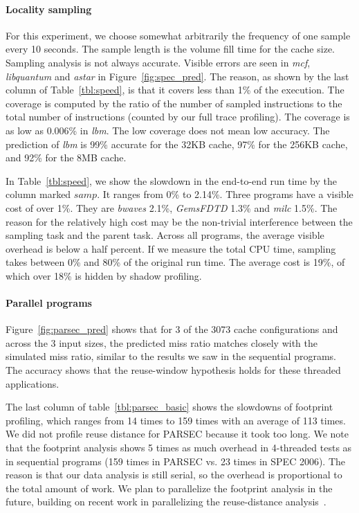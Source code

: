 \paragraph{Locality sampling}
\label{sec:samp-result}

For this experiment, we choose somewhat arbitrarily the frequency of
one sample every 10 seconds.  The sample length is the volume fill
time for the cache size.  Sampling analysis is not always accurate.
Visible errors are seen in \emph{mcf}, \emph{libquantum} and
\emph{astar} in Figure~\ref{fig:spec_pred}.  The reason, as shown by
the last column of Table~\ref{tbl:speed}, is that it covers less than
1\% of the execution.  The coverage is computed by the ratio of the
number of sampled instructions to the total number of instructions
(counted by our full trace profiling).  The coverage is as low as
0.006\% in \emph{lbm}.  The low coverage does not mean low
accuracy. The prediction of \emph{lbm} is 99\% accurate for the 32KB
cache, 97\% for the 256KB cache, and 92\% for the 8MB cache.


In Table~\ref{tbl:speed}, we show the slowdown in the end-to-end run
time by the column marked $samp$.  It ranges from 0\% to 2.14\%. Three
programs have a visible cost of over 1\%.  They are \emph{bwaves}
2.1\%, \emph{GemsFDTD} 1.3\% and \emph{milc} 1.5\%.  The reason for
the relatively high cost may be the non-trivial interference between
the sampling task and the parent task.  Across all programs, the
average visible overhead is below a half percent. If we measure the
total CPU time, sampling takes between 0\% and 80\% of the original
run time.  The average cost is 19\%, of which over 18\% is hidden by
shadow profiling. 

\paragraph{Parallel programs}
Figure~\ref{fig:parsec_pred} shows that for 3 of the 3073 cache
configurations and across the 3 input sizes, the predicted miss ratio
matches closely with the simulated miss ratio, similar to the results
we saw in the sequential programs.  The accuracy shows that the
reuse-window hypothesis holds for these threaded applications.

The last column of table~\ref{tbl:parsec_basic} shows the slowdowns of
footprint profiling, which ranges from 14 times to 159 times with an average
of 113 times.  We did not profile reuse distance for PARSEC because it took
too long.  We note that the footprint analysis shows 5 times as much
overhead in 4-threaded tests as in sequential programs (159 times in
PARSEC vs. 23 times in SPEC
2006).  The reason is that our data analysis is still serial, so the
overhead is proportional to the total amount of work.  We plan to
parallelize the footprint analysis in the future, building on recent
work in parallelizing the reuse-distance analysis~\cite{Cui+:IPDPS12,
Gupta+:IPDPS12,Niu+:IPDPS12}.

